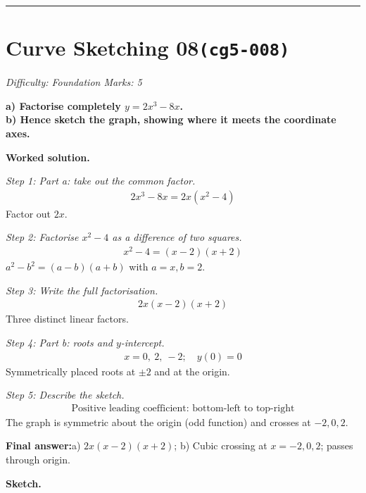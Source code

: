 \documentclass[11pt]{article}
\newcommand{\question}[1]{\par\medskip\noindent\textbf{#1}\par}
\begin{document}
\medskip\hrule

\section*{Curve Sketching 08\quad\small\texttt{(cg5-008)}}
\textit{Difficulty: Foundation \quad\textbar\quad Marks: 5}

\question{a) Factorise completely \( y = 2x^3 - 8x \). \\[3pt] b) Hence sketch the graph, showing where it meets the coordinate axes.}

\textbf{Worked solution.}

\textit{Step 1: Part a: take out the common factor.}
\[\begin{gathered}
2x^3 - 8x = 2x(x^2 - 4)
\end{gathered}\]
Factor out \( 2x \).

\textit{Step 2: Factorise \( x^2 - 4 \) as a difference of two squares.}
\[\begin{gathered}
x^2 - 4 = (x-2)(x+2)
\end{gathered}\]
\( a^2 - b^2 = (a-b)(a+b) \) with \( a = x, b = 2 \).

\textit{Step 3: Write the full factorisation.}
\[\begin{gathered}
2x(x - 2)(x + 2)
\end{gathered}\]
Three distinct linear factors.

\textit{Step 4: Part b: roots and \( y \)-intercept.}
\[\begin{gathered}
x = 0,\ 2,\ -2; \quad y(0) = 0
\end{gathered}\]
Symmetrically placed roots at \( \pm 2 \) and at the origin.

\textit{Step 5: Describe the sketch.}
\[\begin{gathered}
\text{Positive leading coefficient: bottom-left to top-right}
\end{gathered}\]
The graph is symmetric about the origin (odd function) and crosses at \( -2, 0, 2 \).

\begin{answerbox}
\textbf{Final answer:}\quad a) \(\displaystyle 2x(x-2)(x+2)\); b) Cubic crossing at \(\displaystyle x = -2, 0, 2\); passes through origin.
\end{answerbox}
\textbf{Sketch.}
\end{document}
